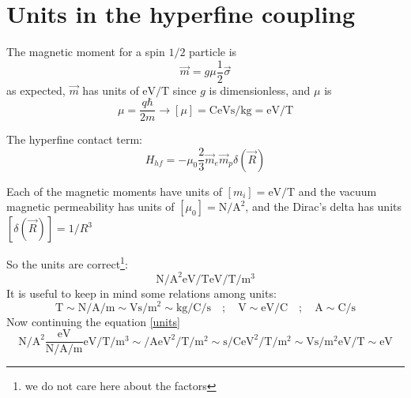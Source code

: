 \chapter{Units in the hyperfine coupling}
The magnetic moment for a spin $1/2$ particle is
\begin{equation}
\vec{m} = g\mu\frac{1}{2}\vec{\sigma}
\end{equation}
as expected, $\vec{m}$ has units of $\si{\eV/\tesla}$ since $g$ is dimensionless, and $\mu$ is
\begin{equation}
  \mu = \frac{q\hbar}{2m} \longrightarrow
  [\mu] = \si{\coulomb\eV\s\per\kilogram} = \si{\eV\per\tesla}
\end{equation}

The hyperfine contact term:
\begin{equation}
  H_{hf} = -\mu_0\frac{2}{3} \vec{m}_e\vec{m}_p\delta(\vec{R})
\end{equation}


Each of the magnetic moments have units of $\left[m_i\right] = \si{\eV\per\tesla}$ and the vacuum magnetic permeability has units of $\left[\mu_0\right]=\si{\newton/\ampere\squared}$, and the Dirac's delta has units $[\delta(\vec{R})]=1/R^3$

So the units are correct\footnote{we do not care here about the factors}:
\begin{equation}
  \si{\newton\per\ampere\squared}\si{\eV\per\tesla}\si{\eV\per\tesla}\si{\per\m\cubed}
\label{units}
\end{equation}
It is useful to keep in mind some relations among units:
\begin{equation}
  \si{\tesla} \sim
  \si{\newton\per\ampere\per\m}\sim\si{\volt\s\per\m\squared} \sim
  \si{\kilogram\per\coulomb\per\s}  \quad;\quad
  \si{\V}\sim\si{\eV\per\coulomb}  \quad;\quad
  \si{\ampere}\sim\si{\coulomb\per\s}
\end{equation}
Now continuing the equation \eqref{units}
\begin{equation}
  \si{\newton\per\ampere\squared}\frac{\si{\eV}}{\si{\newton\per\ampere\per\m}}\si{\eV\per\tesla}\si{\per\m\cubed} \sim
  \si{\per\ampere}\si{\eV\squared\per\tesla}\si{\per\m\squared} \sim
  \si{\s\per\coulomb}\si{\eV\squared\per\tesla}\si{\per\m\squared} \sim
  \si{\V\s\per\m\squared}\si{\eV\per\tesla}\sim \si{\eV}
\end{equation}

